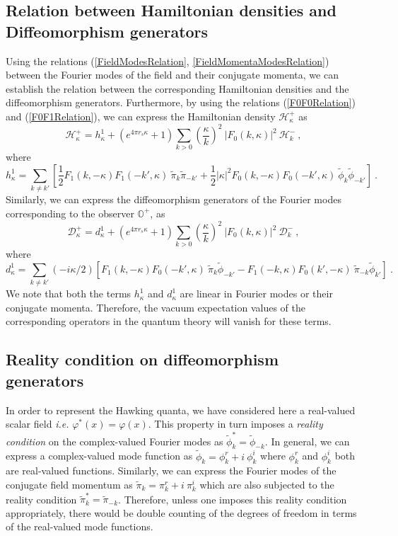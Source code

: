 \documentclass[aps,12pt,showpacs]{revtex4-2}
\def\kr{\kappa}
\def\rs{r_s}
\def\observerplus{\mathbb{O}^{+}}
\begin{document}
\subsection{Relation between Hamiltonian densities and Diffeomorphism 
generators}


Using the relations (\ref{FieldModesRelation}, \ref{FieldMomentaModesRelation}) 
between the Fourier modes of the field and their conjugate momenta, we can 
establish the relation between the corresponding Hamiltonian densities and the 
diffeomorphism generators. Furthermore, by using the relations  
(\ref{F0F0Relation}) and (\ref{F0F1Relation}), we can express the Hamiltonian 
density $\mathcal{H}_{\kr}^{+}$ as
%
\begin{equation}\label{ModesHamiltonianRelations0}
\mathcal{H}_{\kr}^{+} = h_{\kr}^1 + (e^{4\pi\rs\kr} + 1)  
\sum_{k>0} \left(\frac{\kr}{k}\right)^2 ~|F_{0}(k,\kr)|^2 ~\mathcal{H}_k^{-}  ~,
\end{equation}
%
where 
%
$$
h_{\kr}^1 =  \sum_{k\neq k'} [ 
\frac{1}{2} F_{1}(k,-\kr) F_{1}(-k',\kr) ~ \tilde{\pi}_{k}  \tilde{\pi}_{-k'} 
+ \frac{1}{2} |\kr|^2 F_{0}(k,-\kr) F_{0}(-k',\kr) ~ 
\tilde{\phi}_{k} \tilde{\phi}_{-k'} ] ~.
$$
%
Similarly, we can express the diffeomorphism generators of the Fourier modes  
corresponding to the observer $\observerplus$, as
%
\begin{equation}\label{ModesDiffeomorphismRelations0}
\mathcal{D}_{\kr}^{+} = d_{\kr}^1 + (e^{4\pi\rs\kr} + 1)  
\sum_{k>0} \left(\frac{\kr}{k}\right)^2 ~|F_{0}(k,\kr)|^2 ~\mathcal{D}_k^{-}  ~,
\end{equation}
%
where 
%
$$
d_{\kr}^1 =  \sum_{k\neq k'} (-i\kr/2) [  F_{1}(k,-\kr) F_{0}(-k',\kr) ~ 
\tilde{\pi}_{k}  \tilde{\phi}_{-k'} 
- F_{1}(-k,\kr) F_{0}(k',-\kr) ~ \tilde{\pi}_{-k} \tilde{\phi}_{k'} ]~.
$$
%
We note that both the terms $h_{\kr}^1$ and $d_{\kr}^1$ are linear in 
Fourier modes or their conjugate momenta. Therefore, the vacuum expectation 
values of the corresponding operators in the quantum theory will vanish 
for these terms.



\subsection{Reality condition on diffeomorphism generators}


In order to represent the Hawking quanta, we have considered here a 
real-valued scalar field \emph{i.e.} $\varphi^{*}(x) = \varphi(x)$. This 
property in turn imposes a \emph{reality condition} on the complex-valued 
Fourier modes as $\tilde{\phi}^{*}_{k} = \tilde{\phi}_{-k}$. In general, we can 
express a complex-valued mode function as $\tilde{\phi}_{k} = \phi_{k}^r + 
i~\phi_{k}^i$ where  $\phi_{k}^r$ and $\phi_{k}^i$ both are real-valued 
functions. Similarly, we can express the Fourier modes of the conjugate field 
momentum as $\tilde{\pi}_{k} = \pi_{k}^r + i~\pi_{k}^i$ which are also 
subjected to the reality condition $\tilde{\pi}^{*}_{k} = \tilde{\pi}_{-k}$. 
Therefore, unless one imposes this reality condition appropriately, there would 
be double counting of the degrees of freedom in terms of the real-valued mode 
functions.  
 
\end{document}
